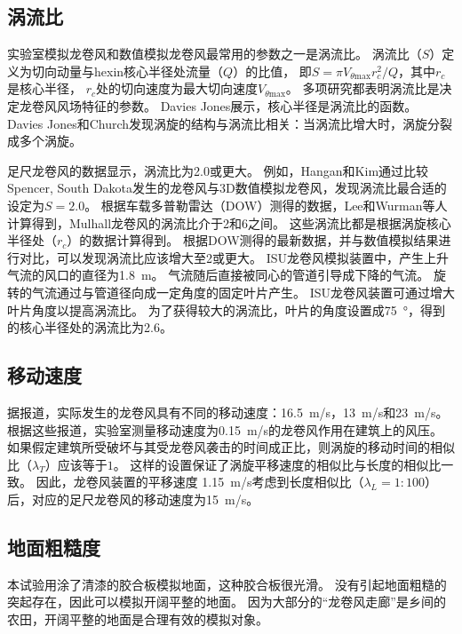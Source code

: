 \documentclass{ctexart}
\begin{document}
\subsection{涡流比}
实验室模拟龙卷风和数值模拟龙卷风最常用的参数之一是涡流比。
涡流比（$S$）定义为切向动量与hexin核心半径处流量（$Q$）的比值，
即$S=\pi V_{\theta \mathrm{max}}r_c^2/Q$，其中$r_c$是核心半径，
$r_c$处的切向速度为最大切向速度$V_{\theta \mathrm{max}}$。
多项研究都表明涡流比是决定龙卷风风场特征的参数。
Davies Jones展示，核心半径是涡流比的函数。
Davies Jones和Church发现涡旋的结构与涡流比相关：当涡流比增大时，涡旋分裂成多个涡旋。

足尺龙卷风的数据显示，涡流比为\num{2.0}或更大。
例如，Hangan和Kim通过比较Spencer, South Dakota发生的龙卷风与3D数值模拟龙卷风，发现涡流比最合适的设定为$S=2.0$。
根据车载多普勒雷达（DOW）测得的数据，Lee和Wurman等人计算得到，Mulhall龙卷风的涡流比介于\num{2}和\num{6}之间。
这些涡流比都是根据涡旋核心半径处（$r_c$）的数据计算得到。
根据DOW测得的最新数据，并与数值模拟结果进行对比，可以发现涡流比应该增大至\num{2}或更大。
ISU龙卷风模拟装置中，产生上升气流的风口的直径为\SI{1.8}{\meter}。
气流随后直接被同心的管道引导成下降的气流。
旋转的气流通过与管道径向成一定角度的固定叶片产生。
ISU龙卷风装置可通过增大叶片角度以提高涡流比。
为了获得较大的涡流比，叶片的角度设置成\SI{75}{\degree}，得到的核心半径处的涡流比为\num{2.6}。

\subsection{移动速度}
据报道，实际发生的龙卷风具有不同的移动速度：\SI{16.5}{m/s}，\SI{13}{m/s}和\SI{23}{m/s}。
根据这些报道，实验室测量移动速度为\SI{0.15}{m/s}的龙卷风作用在建筑上的风压。
如果假定建筑所受破坏与其受龙卷风袭击的时间成正比，则涡旋的移动时间的相似比（$\lambda_T$）应该等于$1$。
这样的设置保证了涡旋平移速度的相似比与长度的相似比一致。
因此，龙卷风装置的平移速度 \SI{1.15}{m/s}考虑到长度相似比（$\lambda_L=1:100$）后，对应的足尺龙卷风的移动速度为\SI{15}{m/s}。

\subsection{地面粗糙度}
本试验用涂了清漆的胶合板模拟地面，这种胶合板很光滑。
没有引起地面粗糙的突起存在，因此可以模拟开阔平整的地面。
因为大部分的“龙卷风走廊”是乡间的农田，开阔平整的地面是合理有效的模拟对象。
\end{document}
